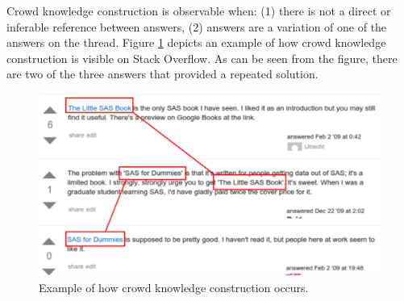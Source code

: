 \documentclass{sig-alternate-05-2015}
\begin{document}
	Crowd knowledge construction is observable when:
	(1) there is not a direct or inferable reference between answers, 
	(2) answers are a variation of one of the answers on the thread.
	Figure \ref{fig:CKC_MLSO} depicts an example of how crowd knowledge construction is visible on Stack Overflow.
	As can be seen from the figure, there are two of the three answers that provided a repeated solution.


	\begin{figure} [!htb]
		\centering
		\includegraphics[width=\columnwidth]{Figures/SO-CSimg2}
		\caption{Example of how crowd knowledge construction occurs.}
		\label{fig:CKC_MLSO}
	\end{figure}



\end{document}
